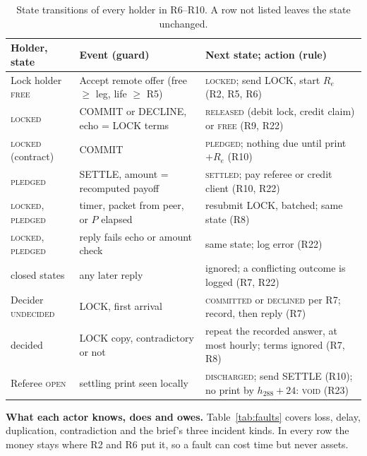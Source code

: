 \begin{table}[H]\centering
\begin{tabularx}{\linewidth}{>{\raggedright\arraybackslash}p{2.6cm}>{\raggedright\arraybackslash}p{4.1cm}>{\raggedright\arraybackslash}X}
\toprule
Holder, state & Event (guard) & Next state; action (rule)\\
\midrule
Lock holder \textsc{free} & Accept remote offer (free $\ge$ leg, life $\ge$ R5) & \textsc{locked}; send LOCK, start $R_e$ (R2, R5, R6)\\
\textsc{locked} & COMMIT or DECLINE, echo = LOCK terms & \textsc{released} (debit lock, credit claim) or \textsc{free} (R9, R22)\\
\textsc{locked} (contract) & COMMIT & \textsc{pledged}; nothing due until print $+R_e$ (R10)\\
\textsc{pledged} & SETTLE, amount = recomputed payoff & \textsc{settled}; pay referee or credit client (R10, R22)\\
\textsc{locked}, \textsc{pledged} & timer, packet from peer, or $P$ elapsed & resubmit LOCK, batched; same state (R8)\\
\textsc{locked}, \textsc{pledged} & reply fails echo or amount check & same state; log error (R22)\\
closed states & any later reply & ignored; a conflicting outcome is logged (R7, R22)\\
\midrule
Decider \textsc{undecided} & LOCK, first arrival & \textsc{committed} or \textsc{declined} per R7; record, then reply (R7)\\
decided & LOCK copy, contradictory or not & repeat the recorded answer, at most hourly; terms ignored (R7, R8)\\
Referee \textsc{open} & settling print seen locally & \textsc{discharged}; send SETTLE (R10); no print by $h_{288}{+}24$: \textsc{void} (R23)\\
\bottomrule
\end{tabularx}
\caption{State transitions of every holder in R6--R10. A row not listed leaves the state unchanged.}\label{tab:states}
\end{table}

\textbf{What each actor knows, does and owes.} Table~\ref{tab:faults} covers loss, delay, duplication,
contradiction and the brief's three incident kinds. In every row the money stays where R2 and R6 put it, so a fault
can cost time but never assets.

